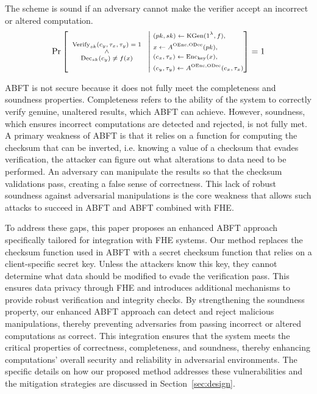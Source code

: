 \begin{definition}[Soundness]
The scheme is sound if an adversary cannot make the verifier accept an incorrect or altered computation.
\begin{equation}
\scriptsize
\Pr\left[
\begin{array}{c}
    \text{Verify}_{sk}(c_y, \tau_x, \tau_y) = 1 \\
    \land \\
    \text{Dec}_{sk}(c_y) \neq f(x)
\end{array}
\;\middle|\;
\begin{aligned}
    &(pk, sk) \leftarrow \text{KGen}(1^\lambda,f), \\
    &x \leftarrow A^{\text{OEnc},\text{ODec}}(pk), \\
    &(c_x, \tau_x) \leftarrow \text{Enc}_{\text{key}}(x), \\
    &(c_y, \tau_y) \leftarrow A^{\text{OEnc},\text{ODec}}(c_x, \tau_x)
\end{aligned}
\right] = 1
\end{equation}
\end{definition}

ABFT is not secure because it does not fully meet the completeness and soundness properties. Completeness refers to the ability of the system to correctly verify genuine, unaltered results, which ABFT can achieve. However, soundness, which ensures incorrect computations are detected and rejected, is not fully met. A primary weakness of ABFT is that it relies on a function for computing the checksum that can be inverted, i.e. knowing a value of a checksum that evades verification, the attacker can figure out what alterations to data need to be performed.  An adversary can manipulate the results so that the checksum validations pass, creating a false sense of correctness. This lack of robust soundness against adversarial manipulations is the core weakness that allows such attacks to succeed in ABFT and ABFT combined with FHE.


To address these gaps, this paper proposes an enhanced ABFT approach specifically tailored for integration with FHE systems. Our method replaces the checksum function used in ABFT with a secret checksum function that relies on a client-specific secret key. Unless the attackers know this key, they cannot determine what data should be modified to evade the verification pass. This ensures data privacy through FHE and introduces additional mechanisms to provide robust verification and integrity checks. By strengthening the soundness property, our enhanced ABFT approach can detect and reject malicious manipulations, thereby preventing adversaries from passing incorrect or altered computations as correct. This integration ensures that the system meets the critical properties of correctness, completeness, and soundness, thereby enhancing computations' overall security and reliability in adversarial environments. The specific details on how our proposed method addresses these vulnerabilities and the mitigation strategies are discussed in Section~\ref{sec:design}.



